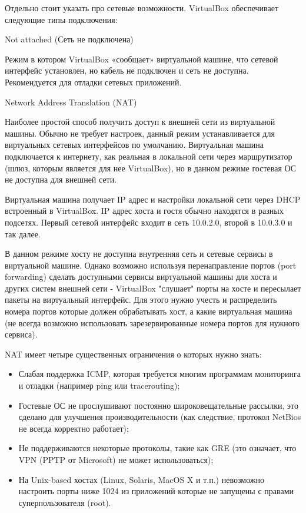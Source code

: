 Отдельно стоит указать про сетевые возможности. VirtualBox обеспечивает следующие типы подключения:
\begin{itemize}
{\item Not attached (Сеть не подключена)

Режим в котором VirtualBox «сообщает» виртуальной машине, что сетевой интерфейс установлен, но кабель не подключен и сеть не доступна. Рекомендуется для отладки сетевых приложений.}

{\item Network Address Translation (NAT)

Наиболее простой способ получить доступ к внешней сети из виртуальной машины. Обычно не требует настроек, данный режим устанавливается для виртуальных сетевых интерфейсов по умолчанию. Виртуальная машина подключается к интернету, как реальная в локальной сети через маршрутизатор (шлюз, которым является для нее VirtualBox), но в данном режиме гостевая ОС не доступна для внешней сети.

Виртуальная машина получает IP адрес и настройки локальной сети через DHCP встроенный в VirtualBox. IP адрес хоста и гостя обычно находятся в разных подсетях. Первый сетевой интерфейс входит в сеть 10.0.2.0, второй в 10.0.3.0 и так далее. 

В данном режиме хосту не доступна внутренняя сеть и сетевые сервисы в виртуальной машине. Однако возможно используя перенаправление портов (port forwarding) сделать доступными сервисы виртуальной машины для хоста и других систем внешней сети - VirtualBox "слушает" порты на хосте и пересылает пакеты на виртуальный интерфейс. Для этого нужно учесть и распределить номера портов которые должен обрабатывать хост, а какие виртуальная машина (не всегда возможно использовать зарезервированные номера портов для нужного сервиса).


NAT имеет четыре существенных ограничения о которых нужно знать:
	\begin{itemize}
	\item Слабая поддержка ICMP, которая требуется многим программам мониторинга и отладки (например ping 	или tracerouting);
	\item Гостевые ОС не прослушивают постоянно широковещательные рассылки, это сделано для улучшения производительности (как следствие, протокол NetBios не всегда корректно работает);
	\item Не поддерживаются некоторые протоколы, такие как GRE (это означает, что VPN (PPTP от Microsoft) не может использоваться);
	\item На Unix-based хостах (Linux, Solaris, MacOS X и т.п.) невозможно настроить порты ниже 1024 из приложений которые не запущены с правами суперпользователя (root). 
	\end{itemize}
}


\end{itemize}
